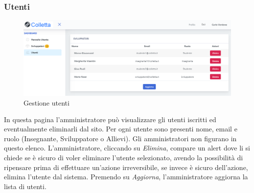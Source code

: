 		\subsubsection{Utenti}
			\begin{figure}[H]
				\centering
				\includegraphics[width=17cm]{sez/img/amministratore/gestisciutenti.PNG}
				\caption{Gestione utenti}\label{fig:1}
			\end{figure}
		  In questa pagina l'amministratore può visualizzare gli utenti iscritti ed eventualmente eliminarli dal sito. Per ogni utente sono presenti nome, email e ruolo (Insegnante, Sviluppatore o Allievi). Gli amministratori non figurano in questo elenco. L'amministratore, cliccando su \textit{Elimina}, compare un alert dove li si chiede se è sicuro di voler eliminare l'utente selezionato, avendo la possibilità di ripensare prima di effettuare un'azione irreversibile, se invece è sicuro dell'azione, elimina l'utente dal sistema. Premendo su \textit{Aggiorna}, l'amministratore aggiorna la lista di utenti.
